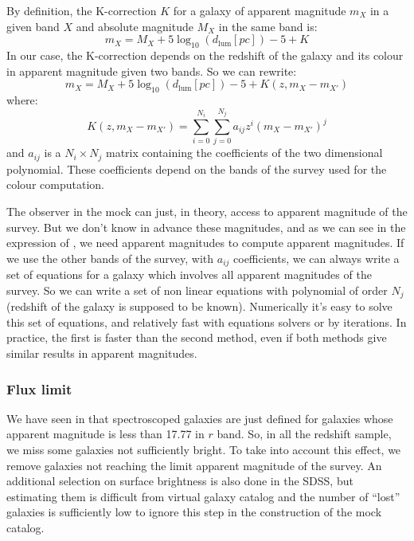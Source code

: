 By definition, the K-correction $K$ for a galaxy of apparent magnitude $m_X$
in a given band $X$ and absolute magnitude $M_X$ in the same band is:
%
\begin{equation}
    m_X=M_X + 5\log_{10}\left(d_\mathrm{lum}\left[pc\right]\right) - 5 + K
\end{equation}
%
In our case, the K-correction depends on the redshift of the galaxy and its
colour in apparent magnitude given two bands. So we can rewrite:
%
\begin{equation}
    \label{eq:appmag}
    m_X=M_X +
        5\log_{10}\left(d_\mathrm{lum}\left[pc\right]\right) - 5 +
        K\left(z, m_X - m_{X'}\right)
\end{equation}
%
where:
%
\begin{equation}
    K\left(z,m_X-m_{X'}\right)=\sum_{i=0}^{N_i}\sum_{j=0}^{N_j} a_{ij} z^i
    {\left(m_X-m_{X'}\right)}^j
\end{equation}
%
and $a_{ij}$ is a $N_i\times N_j$ matrix containing the coefficients of the
two dimensional polynomial. These coefficients depend on the bands of the
survey used for the colour computation.

The observer in the mock can just, in theory, access to apparent magnitude of
the survey. But we don't know in advance these magnitudes, and as we can see in
the expression of , we need apparent magnitudes to
compute apparent magnitudes. If we use the other bands of the survey, with
$a_{ij}$ coefficients, we can always write a set of equations for a galaxy
which involves all apparent magnitudes of the survey. So we can write a set of
non linear equations with polynomial of order $N_j$ (redshift of the galaxy is
supposed to be known). Numerically it's easy to solve this set of equations,
and relatively fast with equations solvers or by iterations. In practice, the
first is faster than the second method, even if both methods give similar
results in apparent magnitudes.

\subsubsection{Flux limit}

We have seen in  that spectroscoped galaxies are just
defined for galaxies whose apparent magnitude is less than 17.77 in $r$ band.
So, in all the redshift sample, we miss some galaxies not sufficiently bright.
To take into account this effect, we remove galaxies not reaching the limit
apparent magnitude of the survey. An additional selection on surface brightness
is also done in the SDSS, but estimating them is difficult from virtual galaxy
catalog and the number of ``lost'' galaxies is sufficiently low to ignore this
step in the construction of the mock catalog.

